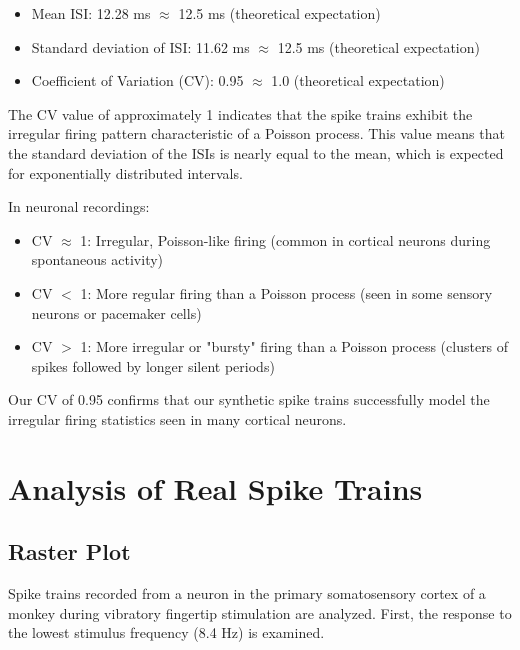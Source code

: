 \documentclass{article}
\begin{document}
\begin{itemize}
    \item Mean ISI: 12.28 ms $\approx$ 12.5 ms (theoretical expectation)
    \item Standard deviation of ISI: 11.62 ms $\approx$ 12.5 ms (theoretical expectation)
    \item Coefficient of Variation (CV): 0.95 $\approx$ 1.0 (theoretical expectation)
\end{itemize}

The CV value of approximately 1 indicates that the spike trains exhibit the irregular firing pattern characteristic of a Poisson process. 
This value means that the standard deviation of the ISIs is nearly equal to the mean, which is expected for exponentially distributed intervals. 

In neuronal recordings:
\begin{itemize}
    \item CV $\approx$ 1: Irregular, Poisson-like firing (common in cortical neurons during spontaneous activity)
    \item CV $<$ 1: More regular firing than a Poisson process (seen in some sensory neurons or pacemaker cells)
    \item CV $>$ 1: More irregular or "bursty" firing than a Poisson process (clusters of spikes followed by longer silent periods)
\end{itemize}

Our CV of 0.95 confirms that our synthetic spike trains successfully model the irregular firing statistics seen in many cortical neurons.

\section{Analysis of Real Spike Trains}

\subsection{Raster Plot}

Spike trains recorded from a neuron in the primary somatosensory cortex of a monkey during vibratory fingertip stimulation are analyzed. First, the response to the lowest stimulus frequency (8.4 Hz) is examined.
\end{document}
